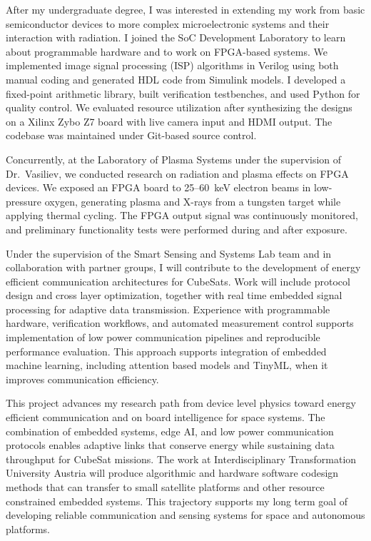 \documentclass[a4paper,12pt]{article}
\begin{document}
After my undergraduate degree, I was interested in extending my work from basic semiconductor devices to more complex microelectronic systems and their interaction with radiation. I joined the SoC Development Laboratory to learn about programmable hardware and to work on FPGA-based systems. We implemented image signal processing (ISP) algorithms in Verilog using both manual coding and generated HDL code from Simulink models. I developed a fixed-point arithmetic library, built verification testbenches, and used Python for quality control. We evaluated resource utilization after synthesizing the designs on a Xilinx Zybo Z7 board with live camera input and HDMI output. The codebase was maintained under Git-based source control. 

Concurrently, at the Laboratory of Plasma Systems under the supervision of Dr.\ Vasiliev, we conducted research on radiation and plasma effects on FPGA devices. We exposed an FPGA board to 25--60~keV electron beams in low-pressure oxygen, generating plasma and X-rays from a tungsten target while applying thermal cycling. The FPGA output signal was continuously monitored, and preliminary functionality tests were performed during and after exposure.

Under the supervision of the Smart Sensing and Systems Lab team and in collaboration with partner groups, I will contribute to the development of energy efficient communication architectures for CubeSats. Work will include protocol design and cross layer optimization, together with real time embedded signal processing for adaptive data transmission. Experience with programmable hardware, verification workflows, and automated measurement control supports implementation of low power communication pipelines and reproducible performance evaluation. This approach supports integration of embedded machine learning, including attention based models and TinyML, when it improves communication efficiency.

This project advances my research path from device level physics toward energy efficient communication and on board intelligence for space systems. The combination of embedded systems, edge AI, and low power communication protocols enables adaptive links that conserve energy while sustaining data throughput for CubeSat missions. The work at Interdisciplinary Transformation University Austria will produce algorithmic and hardware software codesign methods that can transfer to small satellite platforms and other resource constrained embedded systems. This trajectory supports my long term goal of developing reliable communication and sensing systems for space and autonomous platforms.
\end{document}
